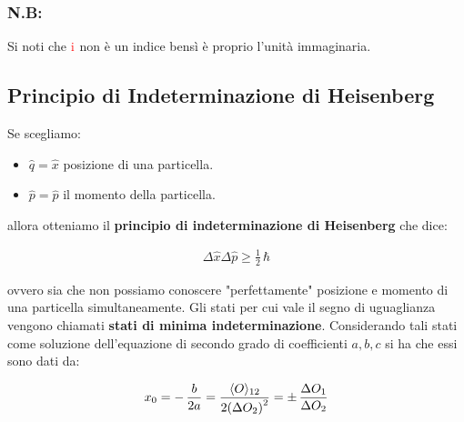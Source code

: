 	\subsubsection{N.B:}
		
		Si noti che $\textcolor{red}{\text{i}}$ non è un indice bensì è proprio l'unità immaginaria.
		
\subsection{Principio di Indeterminazione di Heisenberg}

\begin{myth}
	Se scegliamo:
\begin{itemize}
	 \item $\hat{q} = \hat{x}$ posizione di una particella.
	 \item $\hat{p} = \hat{p}$ il momento della particella.
\end{itemize}

	allora otteniamo il \textbf{principio di indeterminazione di Heisenberg} che dice:
	
\begin{align*}
	\Delta \hat{x} \Delta \hat{p} \geq \frac{1}{2} \, \hbar
\end{align*}
\end{myth}

	ovvero sia che non possiamo conoscere "perfettamente" posizione e momento di una particella simultaneamente. Gli stati per cui vale il segno di uguaglianza vengono chiamati \textbf{stati di minima indeterminazione}. Considerando tali stati come soluzione dell'equazione di secondo grado di coefficienti $a, b, c$ si ha che essi sono dati da:
	
\begin{align*}
	x_0 = -\, \frac{b}{2a} = \frac{ \langle O \rangle_{12} }{2\qty(\Delta O_2)^2} = \pm \, \frac{\Delta O_1}{\Delta O_2}
\end{align*}
